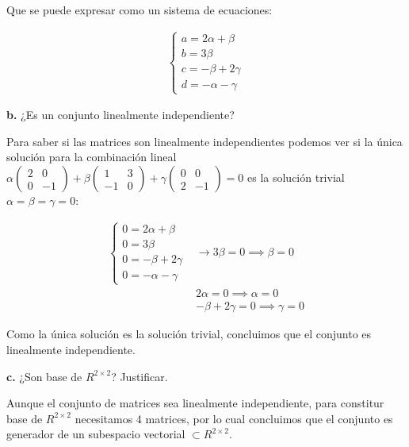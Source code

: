 \documentclass[12pt]{article}
\begin{document}
Que se puede expresar como un sistema de ecuaciones:

\begin{align*}
  \begin{cases}
    a = 2\alpha + \beta\\
    b = 3\beta \\
    c = -\beta + 2\gamma \\
    d = -\alpha - \gamma
  \end{cases}
\end{align*}

\hspace{6mm}\textbf{b.}
¿Es un conjunto linealmente independiente?

Para saber si las matrices son linealmente independientes podemos ver si 
la única solución para la combinación lineal  \(\alpha
\begin{pmatrix}
  2&0\\0&-1
\end{pmatrix} +
\beta
\begin{pmatrix}
  1&3\\-1&0
\end{pmatrix} +
\gamma
\begin{pmatrix}
  0&0\\2&-1
\end{pmatrix} = 0
\) es la solución trivial \(\alpha = \beta = \gamma = 0\):

\begin{align*}
  \begin{cases}
    0 = 2\alpha + \beta\\
    0 = 3\beta \\
    0 = -\beta + 2\gamma \\
    0 = -\alpha - \gamma
  \end{cases} & \rightarrow 3\beta = 0 \implies \beta = 0 \\
  & 2\alpha = 0 \implies \alpha = 0 \\
  & -\beta + 2\gamma = 0 \implies \gamma = 0
\end{align*}

Como la única solución es la solución trivial, 
concluimos que el conjunto es linealmente independiente.

\hspace{6mm}\textbf{c.}
¿Son base de \(R^{2\times2}\)? Justificar.

Aunque el conjunto de matrices sea linealmente independiente,
para constitur base de \(R^{2\times2}\) necesitamos 4 matrices,
por lo cual concluimos que el conjunto es generador de un subespacio vectorial
\(\subset R^{2\times2}\).
\end{document}
